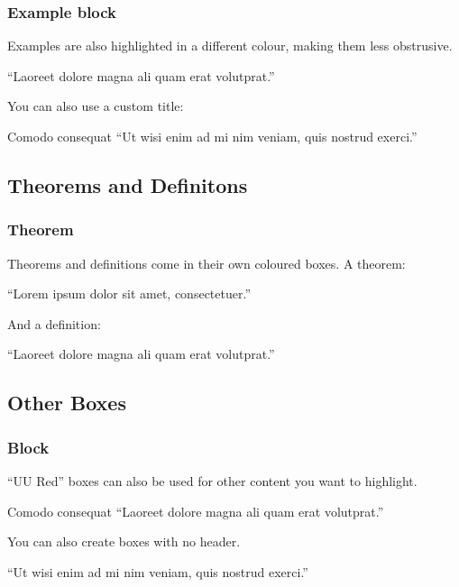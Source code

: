 \documentclass{beamer}
\begin{document}
\begin{frame}
  \frametitle{Example block}

  Examples are also highlighted in a different colour, making them less obstrusive.

  \begin{example}
    ``Laoreet dolore magna ali quam erat volutprat.''
  \end{example}

  You can also use a custom title:

  \begin{exampleblock}{Comodo consequat}
    ``Ut wisi enim ad mi nim veniam, quis nostrud exerci.''
  \end{exampleblock}

\end{frame}

\subsection{Theorems and Definitons}

\begin{frame}
  \frametitle{Theorem}

  Theorems and definitions come in their own coloured boxes. A theorem:

  \begin{theorem}
    ``Lorem ipsum dolor sit amet, consectetuer.''
  \end{theorem}

  And a definition:

  \begin{definition}
    ``Laoreet dolore magna ali quam erat volutprat.''
  \end{definition}

\end{frame}


\subsection{Other Boxes}

\begin{frame}
  \frametitle{Block}

  ``UU Red'' boxes can also be used for other content you want to highlight.

  \begin{block}{Comodo consequat}
    ``Laoreet dolore magna ali quam erat volutprat.''
  \end{block}

  You can also create boxes with no header.

  \begin{block}{}
    ``Ut wisi enim ad mi nim veniam, quis nostrud exerci.''
  \end{block}

\end{frame}
\end{document}
